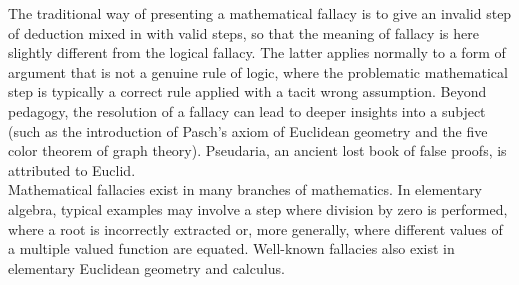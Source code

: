 \documentclass[honours,12pt]{unswthesis}
\numberwithin{equation}{section}
\begin{document}
\noindent The traditional way of presenting a mathematical fallacy is to give an invalid step of deduction mixed in with valid steps, so that the meaning of fallacy is here slightly different from the logical fallacy. The latter applies normally to a form of argument that is not a genuine rule of logic, where the problematic mathematical step is typically a correct rule applied with a tacit wrong assumption. Beyond pedagogy, the resolution of a fallacy can lead to deeper insights into a subject (such as the introduction of Pasch's axiom of Euclidean geometry and the five color theorem of graph theory). Pseudaria, an ancient lost book of false proofs, is attributed to Euclid. \\

\noindent Mathematical fallacies exist in many branches of mathematics. In elementary algebra, typical examples may involve a step where division by zero is performed, where a root is incorrectly extracted or, more generally, where different values of a multiple valued function are equated. Well-known fallacies also exist in elementary Euclidean geometry and calculus.








\clearpage
{}

\end{document}
